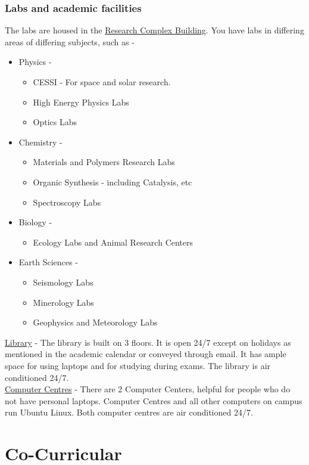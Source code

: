 \documentclass[openany]{book}
\begin{document}
\subsubsection{Labs and academic facilities}
The labs are housed in the \underline{Research Complex Building}. You have labs in differing areas of differing subjects, such as - 
\begin{itemize}
    \item Physics - 
    \begin{itemize}
        \item CESSI - For space and solar research. 
        \item High Energy Physics Labs
        \item Optics Labs
    \end{itemize}
    \item Chemistry - 
    \begin{itemize}
        \item Materials and Polymers Research Labs
        \item Organic Synthesis - including Catalysis, etc
        \item Spectroscopy Labs 
    \end{itemize}
    \item Biology - 
    \begin{itemize}
        \item Ecology Labs and Animal Research Centers
    \end{itemize}
    \item Earth Sciences -
    \begin{itemize}
        \item Seismology Labs
        \item Minerology Labs
        \item Geophysics and Meteorology Labs
    \end{itemize}
\end{itemize}
\underline{Library} - The library is built on 3 floors. It is open 24/7 except on holidays as mentioned in the academic calendar or conveyed through email. It has ample space for using laptops and for studying during exams. The library is air conditioned 24/7. \\ 
\underline{Computer Centres} - 
There are 2 Computer Centers, helpful for people who do not have personal laptops. Computer Centres and all other computers on campus run Ubuntu Linux. Both computer centres are air conditioned 24/7.
\section{Co-Curricular}
\end{document}
